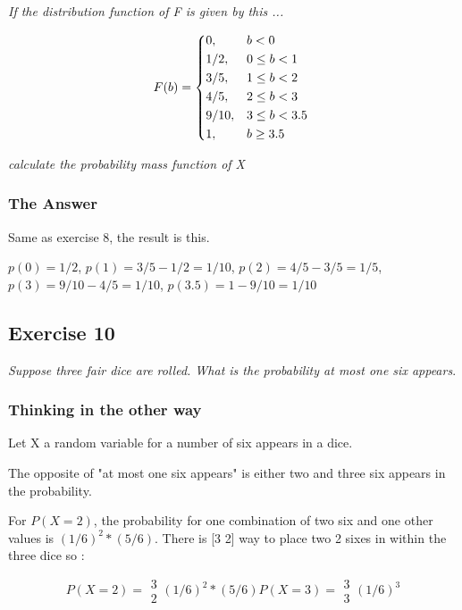\documentclass[12pt,a4paper]{article}
\begin{document}
\textit{If the distribution function of F is given by this ...}

\[
F(b) = \begin{dcases*}
0, & $b < 0$ \\
1/2, & $0 \leq b < 1$ \\ 
3/5, & $1 \leq b < 2$ \\
4/5, & $2 \leq b < 3$ \\
9/10, & $3 \leq b < 3.5$ \\
1, & $b \geq 3.5$ \\
\end{dcases*}
\]

\textit{calculate the probability mass function of X}

\subsubsection{The Answer}

Same as exercise 8, the result is this.

$p(0) = 1/2$,
$p(1) = 3/5 - 1/2 = 1/10$,
$p(2) = 4/5 - 3/5 = 1/5$,
$p(3) = 9/10 - 4/5 = 1/10$,
$p(3.5) = 1-9/10 = 1/10$

\subsection{Exercise 10}
\textit{Suppose three fair dice are rolled. What is the probability at most one six appears}.

\subsubsection{Thinking in the other way}

Let X a random variable for a number of six appears in a dice.

The opposite of "at most one six appears" is either two and three six appears in the probability.

For $P(X=2)$, the probability for one combination of two six and one other values is $(1/6)^2 * (5/6)$. There is [3 2] way to place two 2 sixes in within the three dice so :

\[
P(X=2) = \begin{array}{c}
3 \\
2
\end{array} (1/6)^2 * (5/6)
P(X=3) = \begin{array}{c}
3 \\
3
\end{array} (1/6)^3
\]
\end{document}
